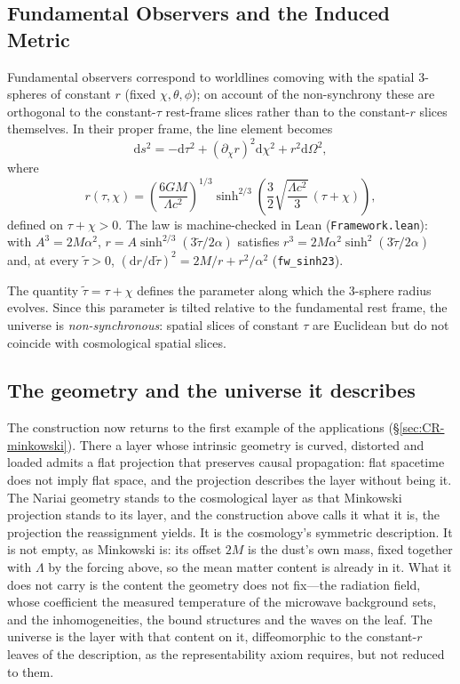 \documentclass[11pt,a4paper]{article}
\theoremstyle{plain}
\theoremstyle{definition}
\theoremstyle{remark}
\newcommand{\dd}{\mathrm{d}}
\begin{document}
\subsection{Fundamental Observers and the Induced Metric}

Fundamental observers correspond to worldlines comoving with the spatial 3-spheres of constant $r$ (fixed $\chi,\theta,\phi$); on account of the non-synchrony these are orthogonal to the constant-$\tau$ rest-frame slices rather than to the constant-$r$ slices themselves. In their proper frame, the line element becomes \cite{Janzen2015}
\begin{equation}
    \mathrm{d}s^2=-\mathrm{d}\tau^2
    +(\partial_{\chi} r)^2\mathrm{d}\chi^2
    +r^2\mathrm{d}\Omega^2,
    \label{eq:SdS-fundamental}
\end{equation}
where
\begin{equation}
    r(\tau,\chi)
    =\left(\frac{6GM}{\Lambda c^2}\right)^{1/3}
    \sinh^{2/3}\!\left(
        \frac{3}{2}\sqrt{\frac{\Lambda c^2}{3}}\,(\tau+\chi)
    \right),
    \label{eq:r-SdS-solution}
\end{equation}
defined on $\tau+\chi>0$.
The law is machine-checked in Lean (\texttt{Framework.lean}): with $A^{3}=2M\alpha^{2}$, $r=A\sinh^{2/3}(3\tilde\tau/2\alpha)$ satisfies $r^{3}=2M\alpha^{2}\sinh^{2}(3\tilde\tau/2\alpha)$ and, at every $\tilde\tau>0$, $(\dd r/\dd\tilde\tau)^{2}=2M/r+r^{2}/\alpha^{2}$ (\texttt{fw\_sinh23}).

The quantity $\tilde{\tau}=\tau+\chi$ defines the parameter along which the 3-sphere radius evolves. Since this parameter is tilted relative to the fundamental rest frame, the universe is \emph{non-synchronous}: spatial slices of constant $\tau$ are Euclidean but do not coincide with cosmological spatial slices.

\subsection{The geometry and the universe it describes}\label{sec:sds-closure}

The construction now returns to the first example of the applications (\S\ref{sec:CR-minkowski}). There a layer whose intrinsic geometry is curved, distorted and loaded admits a flat projection that preserves causal propagation: flat spacetime does not imply flat space, and the projection describes the layer without being it. The Nariai geometry stands to the cosmological layer as that Minkowski projection stands to its layer, and the construction above calls it what it is, the projection the reassignment yields. It is the cosmology's symmetric description. It is not empty, as Minkowski is: its offset $2M$ is the dust's own mass, fixed together with $\Lambda$ by the forcing above, so the mean matter content is already in it. What it does not carry is the content the geometry does not fix---the radiation field, whose coefficient the measured temperature of the microwave background sets, and the inhomogeneities, the bound structures and the waves on the leaf. The universe is the layer with that content on it, diffeomorphic to the constant-$r$ leaves of the description, as the representability axiom requires, but not reduced to them.
\end{document}
